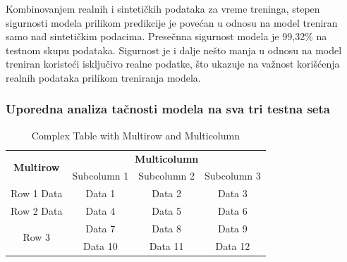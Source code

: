 \documentclass[a4paper,12pt]{article}
\begin{document}
	Kombinovanjem realnih i sintetičkih podataka za vreme treninga, stepen sigurnosti modela prilikom predikcije je povećan u odnosu na model treniran samo nad sintetičkim podacima. Presečnna sigurnost modela je 99,32\% na testnom skupu podataka. Sigurnost je i dalje nešto manja u odnosu na model treniran koristeći isključivo realne podatke, što ukazuje na važnost korišćenja realnih podataka prilikom treniranja modela.
	
	
	\subsubsection{Uporedna analiza tačnosti modela na sva tri testna seta}
	
	\begin{table}[h]
		\centering
		\caption{Complex Table with Multirow and Multicolumn}
		\begin{tabular}{|c|c|c|c|} %
			\hline
			\multirow{2}{*}{\textbf{Multirow}} & \multicolumn{3}{c|}{\textbf{Multicolumn}} \\ %
			\cline{2-4} %
			& Subcolumn 1 & Subcolumn 2 & Subcolumn 3 \\ %
			\hline
			Row 1 Data & Data 1 & Data 2 & Data 3 \\ %
			\hline
			Row 2 Data & Data 4 & Data 5 & Data 6 \\ %
			\hline
			\multirow{2}{*}{Row 3} & Data 7 & Data 8 & Data 9 \\ %
			\cline{2-4} %
			& Data 10 & Data 11 & Data 12 \\ %
			\hline
		\end{tabular}
		\label{tab:complex_table}
	\end{table}
	
\end{document}
